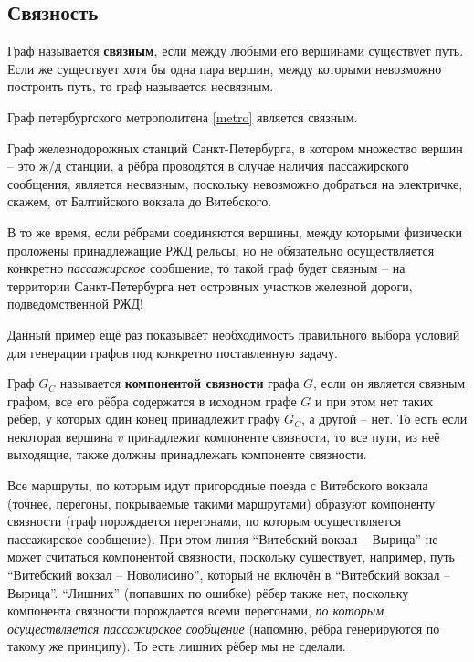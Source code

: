 \subsection{Связность}
\begin{definition}
	Граф называется \textbf{связным}, если между любыми его вершинами существует путь. Если же существует хотя бы одна пара вершин, между которыми невозможно построить путь, то граф называется несвязным.
\end{definition}

\begin{example}
	Граф петербургского метрополитена \ref{metro} является связным.
\end{example}

\begin{example}
	Граф железнодорожных станций Санкт-Петербурга, в котором множество вершин -- это ж/д станции, а рёбра проводятся в случае наличия пассажирского сообщения, является несвязным, поскольку невозможно добраться на электричке, скажем, от Балтийского вокзала до Витебского.
	
	В то же время, если рёбрами соединяются вершины, между которыми физически проложены принадлежащие РЖД рельсы, но не обязательно осуществляется конкретно \textit{пассажирское} сообщение, то такой граф будет связным -- на территории Санкт-Петербурга нет островных участков железной дороги, подведомственной РЖД!
	
	Данный пример ещё раз показывает необходимость правильного выбора условий для генерации графов под конкретно поставленную задачу.
\end{example}

\begin{definition}
	Граф $G_C$ называется \textbf{компонентой связности} графа $G$, если он является связным графом, все его рёбра содержатся в исходном графе $G$ и при этом нет таких рёбер, у которых один конец принадлежит графу $G_C$, а другой -- нет. То есть если некоторая вершина $v$ принадлежит компоненте связности, то все пути, из неё выходящие, также должны принадлежать компоненте связности.
\end{definition}

\begin{example}
	Все маршруты, по которым идут пригородные поезда с Витебского вокзала (точнее, перегоны, покрываемые такими маршрутами) образуют компоненту связности (граф порождается перегонами, по которым осуществляется пассажирское сообщение). При этом линия ``Витебский вокзал -- Вырица'' не может считаться компонентой связности, поскольку существует, например, путь ``Витебский вокзал -- Новолисино'', который не включён в ``Витебский вокзал -- Вырица''. ``Лишних'' (попавших по ошибке) рёбер также нет, поскольку компонента связности порождается всеми перегонами, \textit{по которым осуществляется пассажирское сообщение} (напомню, рёбра генерируются по такому же принципу). То есть лишних рёбер мы не сделали.
\end{example}

